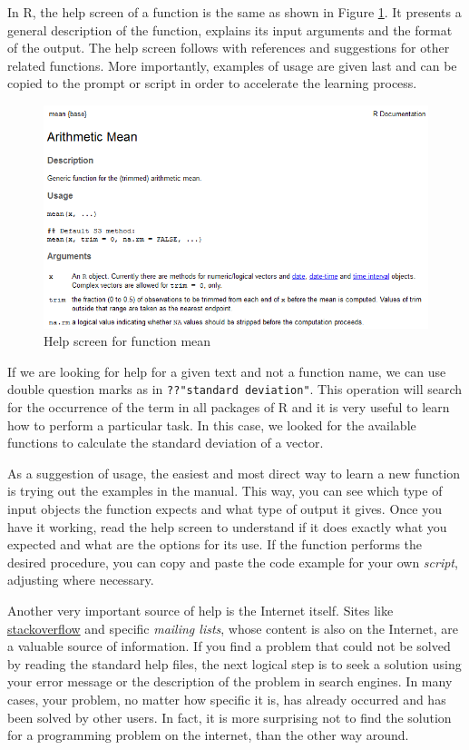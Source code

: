 \documentclass[11pt,]{book}
\begin{document}
In R, the help screen of a function is the same as shown in Figure
\ref{fig:ExampleHelp}. It presents a general description of the
function, explains its input arguments and the format of the output. The
help screen follows with references and suggestions for other related
functions. More importantly, examples of usage are given last and can be
copied to the prompt or script in order to accelerate the learning
process.

\begin{figure}[!htbp]

{\centering \includegraphics[width=1\linewidth]{figs/ExemploAjuda} 

}

\caption{Help screen for function mean}\label{fig:ExampleHelp}
\end{figure}

If we are looking for help for a given text and not a function name, we
can use double question marks as in \texttt{??"standard\ deviation"}.
This operation will search for the occurrence of the term in all
packages of R and it is very useful to learn how to perform a particular
task. In this case, we looked for the available functions to calculate
the standard deviation of a vector.

As a suggestion of usage, the easiest and most direct way to learn a new
function is trying out the examples in the manual. This way, you can see
which type of input objects the function expects and what type of output
it gives. Once you have it working, read the help screen to understand
if it does exactly what you expected and what are the options for its
use. If the function performs the desired procedure, you can copy and
paste the code example for your own \emph{script}, adjusting where
necessary.

Another very important source of help is the Internet itself. Sites like
\href{http://stackoverflow.com/}{stackoverflow} and specific
\emph{mailing lists}, whose content is also on the Internet, are a
valuable source of information. If you find a problem that could not be
solved by reading the standard help files, the next logical step is to
seek a solution using your error message or the description of the
problem in search engines. In many cases, your problem, no matter how
specific it is, has already occurred and has been solved by other users.
In fact, it is more surprising not to find the solution for a
programming problem on the internet, than the other way around.
\end{document}
